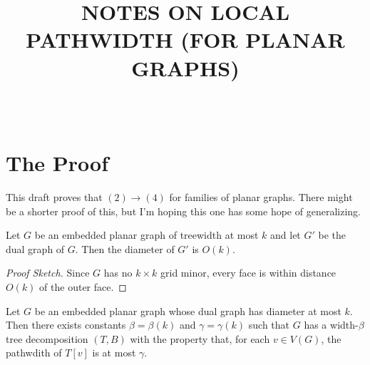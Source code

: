 \documentclass{patmorin}
\title{\MakeUppercase{Notes on Local Pathwidth (for Planar Graphs)}}
\author{\ } %
\begin{document}
\maketitle

\section{The Proof}

This draft proves that $(2)\rightarrow (4)$ for families of planar graphs.  
There might be a shorter proof of this, but I'm hoping this one has some 
hope of generalizing.


\begin{lem}
   Let $G$ be an embedded planar graph of treewidth at most $k$ and let
   $G'$ be the dual graph of $G$.  Then the diameter of $G'$ is $O(k)$.
\end{lem}

\begin{proof}[Proof Sketch]
   Since $G$ has no $k\times k$ grid minor, every face is within distance
   $O(k)$ of the outer face.
\end{proof}


\begin{lem}
  Let $G$ be an embedded planar graph whose dual graph has diameter at most
  $k$. Then there exists constants $\beta=\beta(k)$ and $\gamma=\gamma(k)$
  such that $G$ has a width-$\beta$ tree decomposition $(T,B)$ with
  the property that, for each $v\in V(G)$, the pathwdith of $T[v]$
  is at most $\gamma$.
\end{lem}
\end{document}
